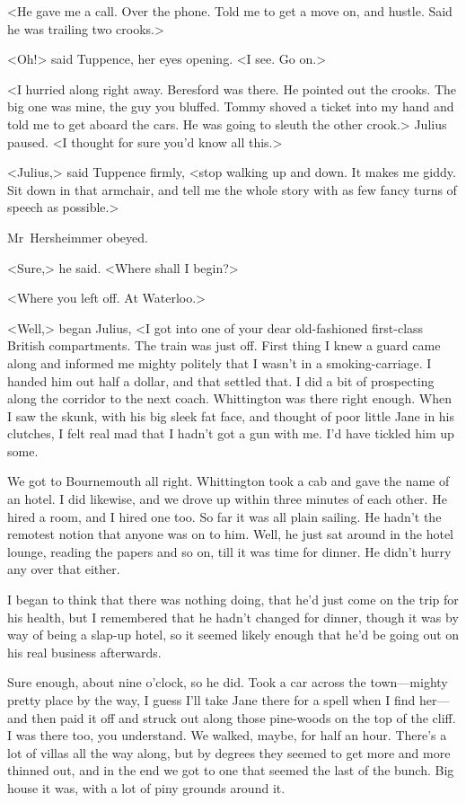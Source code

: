 <He gave me a call. Over the phone. Told me to get a move on, and hustle. Said he was trailing two crooks.>

<Oh!> said Tuppence, her eyes opening. <I see. Go on.>

<I hurried along right away. Beresford was there. He pointed out the crooks. The big one was mine, the guy you bluffed. Tommy shoved a ticket into my hand and told me to get aboard the cars. He was going to sleuth the other crook.> Julius paused. <I thought for sure you'd know all this.>

<Julius,> said Tuppence firmly, <stop walking up and down. It makes me giddy. Sit down in that armchair, and tell me the whole story with as few fancy turns of speech as possible.>

Mr~Hersheimmer obeyed.

<Sure,> he said. <Where shall I begin?>

<Where you left off. At Waterloo.>

<Well,> began Julius, <I got into one of your dear old-fashioned first-class British compartments. The train was just off. First thing I knew a guard came along and informed me mighty politely that I wasn't in a smoking-carriage. I handed him out half a dollar, and that settled that. I did a bit of prospecting along the corridor to the next coach. Whittington was there right enough. When I saw the skunk, with his big sleek fat face, and thought of poor little Jane in his clutches, I felt real mad that I hadn't got a gun with me. I'd have tickled him up some.

We got to Bournemouth all right. Whittington took a cab and gave the name of an hotel. I did likewise, and we drove up within three minutes of each other. He hired a room, and I hired one too. So far it was all plain sailing. He hadn't the remotest notion that anyone was on to him. Well, he just sat around in the hotel lounge, reading the papers and so on, till it was time for dinner. He didn't hurry any over that either.

I began to think that there was nothing doing, that he'd just come on the trip for his health, but I remembered that he hadn't changed for dinner, though it was by way of being a slap-up hotel, so it seemed likely enough that he'd be going out on his real business afterwards.

Sure enough, about nine o'clock, so he did. Took a car across the town—mighty pretty place by the way, I guess I'll take Jane there for a spell when I find her—and then paid it off and struck out along those pine-woods on the top of the cliff. I was there too, you understand. We walked, maybe, for half an hour. There's a lot of villas all the way along, but by degrees they seemed to get more and more thinned out, and in the end we got to one that seemed the last of the bunch. Big house it was, with a lot of piny grounds around it.

